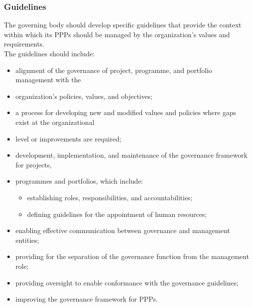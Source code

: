 \documentclass[letterpaper,10pt,english]{jupyterBook}
\begin{document}
\subsubsection{Guidelines}
\label{\detokenize{PM/ppm:guidelines}}
\sphinxAtStartPar
The governing body should develop specific guidelines that provide the context within which its
PPPs should be managed by the organization’s values and requirements. \\
The guidelines should include:
\begin{itemize}
\item {} 
\sphinxAtStartPar
alignment of the governance of project, programme, and portfolio management with the

\item {} 
\sphinxAtStartPar
organization’s policies, values, and objectives;

\item {} 
\sphinxAtStartPar
a process for developing new and modified values and policies where gaps exist at the organizational

\item {} 
\sphinxAtStartPar
level or improvements are required;

\item {} 
\sphinxAtStartPar
development, implementation, and maintenance of the governance framework for projects,

\item {} 
\sphinxAtStartPar
programmes and portfolios, which include:
\begin{itemize}
\item {} 
\sphinxAtStartPar
establishing roles, responsibilities, and accountabilities;

\item {} 
\sphinxAtStartPar
defining guidelines for the appointment of human resources;

\end{itemize}

\item {} 
\sphinxAtStartPar
enabling effective communication between governance and management entities;

\item {} 
\sphinxAtStartPar
providing for the separation of the governance function from the management role;

\item {} 
\sphinxAtStartPar
providing oversight to enable conformance with the governance guidelines;

\item {} 
\sphinxAtStartPar
improving the governance framework for PPPs.

\end{itemize}
\end{document}
